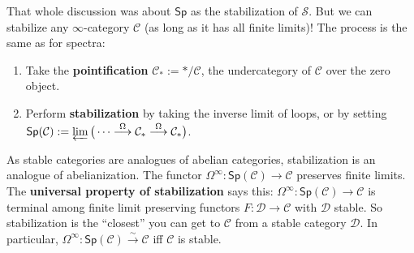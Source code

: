 That whole discussion was about $\mathsf{Sp} $ as the stabilization of $\mathcal{S} $. But we can stabilize any $\infty$-category $\mathcal{C} $ (as long as it has all finite limits)! The process is the same as for spectra:
\begin{enumerate}[label=(\arabic*)]
\setlength\itemsep{-.2em}
    \item Take the \textbf{pointification} $\mathcal{C} _*:= * /\mathcal{C} $, the undercategory of $\mathcal{C} $ over the zero object.
    \item Perform \textbf{stabilization} by taking the inverse limit of loops, or by setting $\mathsf{Sp} (\mathcal{C} ):=\varprojlim \big( \cdots \overset{\Omega}{\longrightarrow} \mathcal{C} _*\overset{\Omega}{\longrightarrow} \mathcal{C} _*\big)$.
\end{enumerate}As stable categories are analogues of abelian categories, stabilization is an analogue of abelianization. The functor $\Omega ^{\infty} \colon \mathsf{Sp} (\mathcal{C} ) \to \mathcal{C} $ preserves finite limits. The \textbf{universal property of stabilization} says this: $\Omega ^{\infty}\colon \mathsf{Sp} (\mathcal{C} ) \to \mathcal{C} $ is terminal among finite limit preserving functors $F \colon \mathcal{D}  \to \mathcal{C} $ with $\mathcal{D} $ stable. So stabilization is the ``closest'' you can get to $\mathcal{C} $ from a stable category $\mathcal{D} $. In particular, $\Omega ^{\infty}\colon \mathsf{Sp} (\mathcal{C} ) \overset{\sim}{\to} \mathcal{C}$ iff $\mathcal{C} $ is stable.

